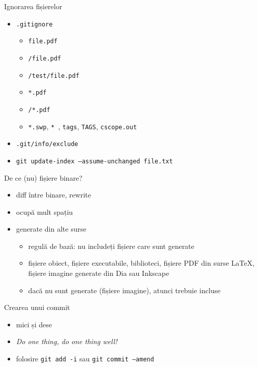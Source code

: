 \documentclass{beamer}
\begin{document}
\begin{frame}{Ignorarea fișierelor}
  \begin{itemize}
    \item \texttt{.gitignore}
      \begin{itemize}
	\item \texttt{file.pdf}
	\item \texttt{/file.pdf}
	\item \texttt{/test/file.pdf}
	\item \texttt{*.pdf}
	\item \texttt{/*.pdf}
	\item \texttt{*.swp}, \texttt{*~}, \texttt{tags}, \texttt{TAGS},
	  \texttt{cscope.out}
      \end{itemize}
    \item \texttt{.git/info/exclude}
    \item \texttt{git update-index --assume-unchanged file.txt}
  \end{itemize}
\end{frame}

\begin{frame}{De ce (nu) fișiere binare?}
  \begin{itemize}
    \item diff între binare, rewrite
    \item ocupă mult spațiu
    \item generate din alte surse
      \begin{itemize}
        \item regulă de bază: nu includeți fișiere care sunt generate
	\item fișiere obiect, fișiere executabile, biblioteci, fișiere PDF din
	  surse \LaTeX, fișiere imagine generate din Dia sau Inkscape
	\item dacă nu sunt generate (fișiere imagine), atunci trebuie incluse
      \end{itemize}
  \end{itemize}
\end{frame}

\begin{frame}{Crearea unui commit}
  \begin{itemize}
    \item mici și dese
    \item \textit{Do one thing, do one thing well!}
    \item folosire \texttt{git add -i} sau \texttt{git commit --amend}
  \end{itemize}
\end{frame}
\end{document}
